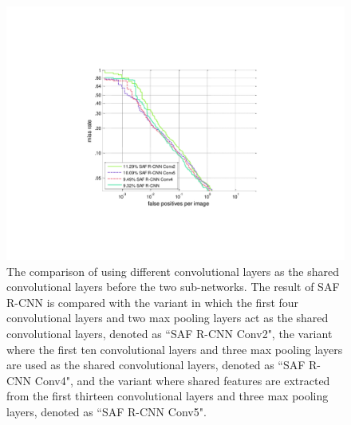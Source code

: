 \documentclass[journal]{IEEEtran}
\begin{document}
\begin{figure}
	\begin{center}
		\includegraphics[scale=0.58]{figures/Caltech_Shared_Features.pdf}
		\caption{{The comparison of using different convolutional layers as the shared convolutional layers before the two sub-networks. The result of SAF R-CNN is compared with the variant in which the first four convolutional layers and two max pooling layers act as the shared convolutional layers, denoted as ``SAF R-CNN Conv2", the variant where the first ten convolutional layers and three max pooling layers are used as the shared convolutional layers, denoted as ``SAF R-CNN Conv4", and the variant where shared features are extracted from the first thirteen convolutional layers and three max pooling layers, denoted as ``SAF R-CNN Conv5".}}	
		\label{fig:Caltech_Shared_Features}
	\end{center}
	\vspace{-4mm}
\end{figure}
\end{document}
